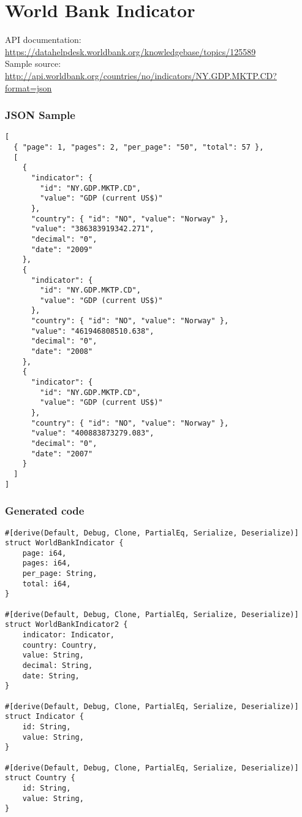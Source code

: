 \section{World Bank Indicator}

API documentation: \url{https://datahelpdesk.worldbank.org/knowledgebase/topics/125589} \\
Sample source: \url{http://api.worldbank.org/countries/no/indicators/NY.GDP.MKTP.CD?format=json}

\begin{multicols}{2}

\subsubsection{JSON Sample}

\begin{verbatim}
[
  { "page": 1, "pages": 2, "per_page": "50", "total": 57 },
  [
    {
      "indicator": {
        "id": "NY.GDP.MKTP.CD",
        "value": "GDP (current US$)"
      },
      "country": { "id": "NO", "value": "Norway" },
      "value": "386383919342.271",
      "decimal": "0",
      "date": "2009"
    },
    {
      "indicator": {
        "id": "NY.GDP.MKTP.CD",
        "value": "GDP (current US$)"
      },
      "country": { "id": "NO", "value": "Norway" },
      "value": "461946808510.638",
      "decimal": "0",
      "date": "2008"
    },
    {
      "indicator": {
        "id": "NY.GDP.MKTP.CD",
        "value": "GDP (current US$)"
      },
      "country": { "id": "NO", "value": "Norway" },
      "value": "400883873279.083",
      "decimal": "0",
      "date": "2007"
    }
  ]
]
\end{verbatim}

\subsubsection{Generated code}

\begin{verbatim}
#[derive(Default, Debug, Clone, PartialEq, Serialize, Deserialize)]
struct WorldBankIndicator {
    page: i64,
    pages: i64,
    per_page: String,
    total: i64,
}

#[derive(Default, Debug, Clone, PartialEq, Serialize, Deserialize)]
struct WorldBankIndicator2 {
    indicator: Indicator,
    country: Country,
    value: String,
    decimal: String,
    date: String,
}

#[derive(Default, Debug, Clone, PartialEq, Serialize, Deserialize)]
struct Indicator {
    id: String,
    value: String,
}

#[derive(Default, Debug, Clone, PartialEq, Serialize, Deserialize)]
struct Country {
    id: String,
    value: String,
}
\end{verbatim}
\end{multicols}
